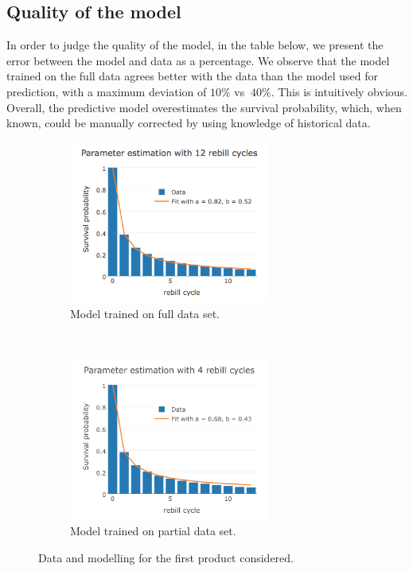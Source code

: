 \documentclass[paper=a4, fontsize=11pt]{scrartcl} %
\numberwithin{equation}{section} %
\numberwithin{figure}{section} %
\numberwithin{table}{section} %
\begin{document}
\subsection{Quality of the model}

In order to judge the quality of the model, in the table below, we present the error between the model and data as a percentage. We observe that the model trained on the full data agrees better with the data than the model used for prediction, with a maximum deviation of $10\%$ vs $~40\%$. This is intuitively obvious. Overall, the predictive model overestimates the survival probability, which, when known, could be manually corrected by using knowledge of historical data. 

\begin{figure}[t!]
	\centering
	\begin{subfigure}[b]{0.5\textwidth}
		\centering
		\includegraphics[height=2.1in]{./figures/VR12cycles.png}
		\caption{Model trained on full data set.}
	\end{subfigure}%
	~ 
	\begin{subfigure}[b]{0.5\textwidth}
		\centering
		\includegraphics[height=2.1in]{./figures/VR4cycles.png}
		\caption{Model trained on partial data set.}
	\end{subfigure}
	\caption{Data and modelling for the first product considered.}
	\label{Frobenius}
\end{figure}
\end{document}
